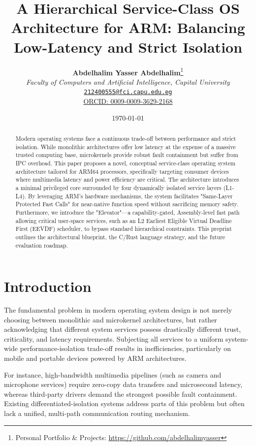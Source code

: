 \documentclass[10pt, a4paper, twocolumn]{article}
\title{\textbf{A Hierarchical Service-Class OS Architecture for ARM: Balancing Low-Latency and Strict Isolation}}
\author{
    \textbf{Abdelhalim Yasser ِAbdelhalim}\thanks{Personal Portfolio \& Projects: \url{https://github.com/abdelhalimyasser}} \\
    \textit{Faculty of Computers and Artificial Intelligence, Capital University} \\
    \href{mailto:212400555@fci.capu.edu.eg}{\texttt{212400555@fci.capu.edu.eg}} \\
    \href{https://orcid.org/0009-0009-3629-2168}{ORCID: 0009-0009-3629-2168}
}
\date{\today}
\begin{document}
\maketitle

\begin{abstract}
Modern operating systems face a continuous trade-off between performance and strict isolation. While monolithic architectures offer low latency at the expense of a massive trusted computing base, microkernels provide robust fault containment but suffer from IPC overhead. This paper proposes a novel, conceptual service-class operating system architecture tailored for ARM64 processors, specifically targeting consumer devices where multimedia latency and power efficiency are critical. The architecture introduces a minimal privileged core surrounded by four dynamically isolated service layers (L1-L4). By leveraging ARM's hardware mechanisms, the system facilitates "Same-Layer Protected Fast Calls" for near-native function speed without sacrificing memory safety. Furthermore, we introduce the "Elevator"—a capability-gated, Assembly-level fast path allowing critical user-space services, such as an L2 Earliest Eligible Virtual Deadline First (EEVDF) scheduler, to bypass standard hierarchical constraints. This preprint outlines the architectural blueprint, the C/Rust language strategy, and the future evaluation roadmap.
\end{abstract}

\section{Introduction}
The fundamental problem in modern operating system design is not merely choosing between monolithic and microkernel architectures, but rather acknowledging that different system services possess drastically different trust, criticality, and latency requirements. Subjecting all services to a uniform system-wide performance-isolation trade-off results in inefficiencies, particularly on mobile and portable devices powered by ARM architectures.

For instance, high-bandwidth multimedia pipelines (such as camera and microphone services) require zero-copy data transfers and microsecond latency, whereas third-party drivers demand the strongest possible fault containment. Existing differentiated-isolation systems address parts of this problem but often lack a unified, multi-path communication routing mechanism.
\end{document}
